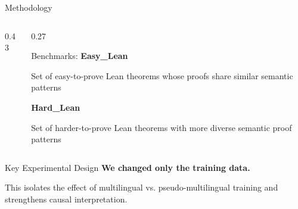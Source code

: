 \documentclass[aspectratio=169]{beamer}
\begin{document}
\begin{frame}{Methodology}
\begin{columns}[T]
\begin{column}{0.43\textwidth}
\end{column}

\begin{column}{0.27\textwidth}
\begin{block}{Benchmarks:}
\vspace{0.35cm}    
\textbf{Easy\_Lean}

Set of easy-to-prove Lean theorems whose proofs share similar semantic patterns
\vspace{0.35cm}

\textbf{Hard\_Lean}

Set of harder-to-prove Lean theorems with more diverse semantic proof patterns
\end{block}
\end{column}

\end{columns}

\vspace{0.25cm}

\begin{alertblock}{Key Experimental Design}
\centering
\textbf{We changed only the training data.}

\vspace{0.12cm}

This isolates the effect of multilingual vs. pseudo-multilingual training and strengthens causal interpretation.
\end{alertblock}

\end{frame}
\end{document}
